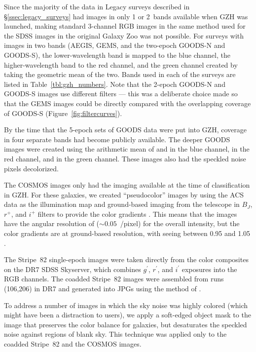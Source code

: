 \documentclass[usenatbib]{mn2e}
\begin{document}
Since the majority of the data in Legacy surveys described in \S\ref{ssec:legacy_surveys} had images in only 1 or 2~bands available when GZH was launched, making standard 3-channel RGB images in the same method used for the SDSS images in the original Galaxy Zoo was not possible. For surveys with images in two bands (AEGIS, GEMS, and the two-epoch GOODS-N and GOODS-S), the lower-wavelength band is mapped to the blue channel, the higher-wavelength band to the red channel, and the green channel created by taking the geometric mean of the two. Bands used in each of the surveys are listed in Table~\ref{tbl:gzh_numbers}. Note that the 2-epoch GOODS-N and GOODS-S images use different filters --- this was a deliberate choice made so that the GEMS images could be directly compared with the overlapping coverage of GOODS-S (Figure~\ref{fig:filtercurves}). 

By the time that the 5-epoch sets of GOODS data were put into GZH, coverage in four separate \hst{} bands had become publicly available. The deeper GOODS images were created using the arithmetic mean of \Bband{} and \Vband in the blue channel, \Iband{} in the red channel, and \zband in the green channel. These images also had the speckled noise pixels decolorized. 

The COSMOS images only had the \Iband{} imaging available at the time of classification in GZH. For these galaxies, we created ``pseudocolor'' images by using the ACS \Iband{} data as the illumination map and ground-based imaging from the \subaru{} telescope in $B_J$, $r^+$, and $i^+$ filters to provide the color gradients \citep[see][for further details]{gri12}. This means that the images have the angular resolution of \hst{} ($\sim0.05$~\arcsec/pixel) for the overall intensity, but the color gradients are at ground-based resolution, with seeing between 0\arcsec.95 and 1\arcsec.05 \citep{tan07}.

The Stripe~82 single-epoch images were taken directly from the color composites on the DR7 SDSS Skyserver, which combines $g^{\prime}$, $r^{\prime}$, and $i^{\prime}$ exposures into the RGB channels. The coadded Stripe~82 images were assembled from runs (106,206) in DR7 and generated into JPGs using the method of \citet{lup04}.

To address a number of images in which the sky noise was highly colored (which might have been a distraction to users), we apply a soft-edged object mask to the image that preserves the color balance for galaxies, but desaturates the speckled noise against regions of blank sky. This technique was applied only to the coadded Stripe~82 and the COSMOS images.
\end{document}
